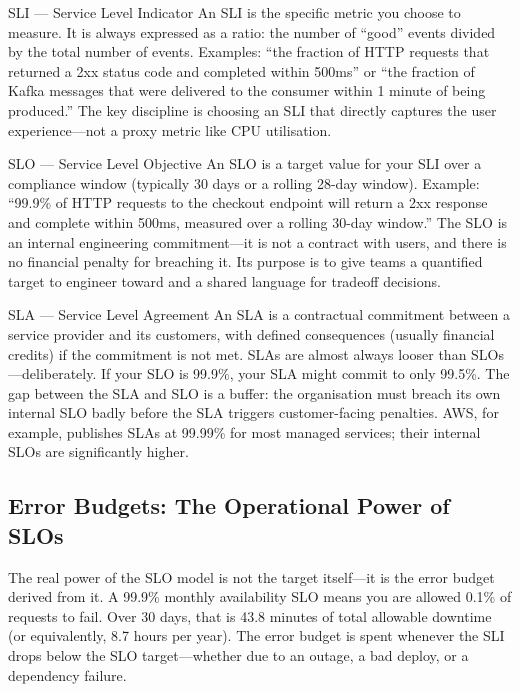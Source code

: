 \documentclass[11pt,a4paper]{article}
\begin{document}
\begin{termbox}{SLI --- Service Level Indicator}
  An SLI is the specific metric you choose to measure. It is always expressed as a ratio: the number of ``good'' events divided by the total number of events. Examples: ``the fraction of HTTP requests that returned a 2xx status code and completed within 500ms'' or ``the fraction of Kafka messages that were delivered to the consumer within 1 minute of being produced.'' The key discipline is choosing an SLI that directly captures the user experience---not a proxy metric like CPU utilisation.
\end{termbox}

\begin{termbox}{SLO --- Service Level Objective}
  An SLO is a target value for your SLI over a compliance window (typically 30 days or a rolling 28-day window). Example: ``99.9\% of HTTP requests to the checkout endpoint will return a 2xx response and complete within 500ms, measured over a rolling 30-day window.'' The SLO is an internal engineering commitment---it is not a contract with users, and there is no financial penalty for breaching it. Its purpose is to give teams a quantified target to engineer toward and a shared language for tradeoff decisions.
\end{termbox}

\begin{termbox}{SLA --- Service Level Agreement}
  An SLA is a contractual commitment between a service provider and its customers, with defined consequences (usually financial credits) if the commitment is not met. SLAs are almost always looser than SLOs---deliberately. If your SLO is 99.9\%, your SLA might commit to only 99.5\%. The gap between the SLA and SLO is a buffer: the organisation must breach its own internal SLO badly before the SLA triggers customer-facing penalties. AWS, for example, publishes SLAs at 99.99\% for most managed services; their internal SLOs are significantly higher.
\end{termbox}

\subsection{Error Budgets: The Operational Power of SLOs}

The real power of the SLO model is not the target itself---it is the error budget derived from it. A 99.9\% monthly availability SLO means you are allowed 0.1\% of requests to fail. Over 30 days, that is 43.8 minutes of total allowable downtime (or equivalently, 8.7 hours per year). The error budget is spent whenever the SLI drops below the SLO target---whether due to an outage, a bad deploy, or a dependency failure.
\end{document}
